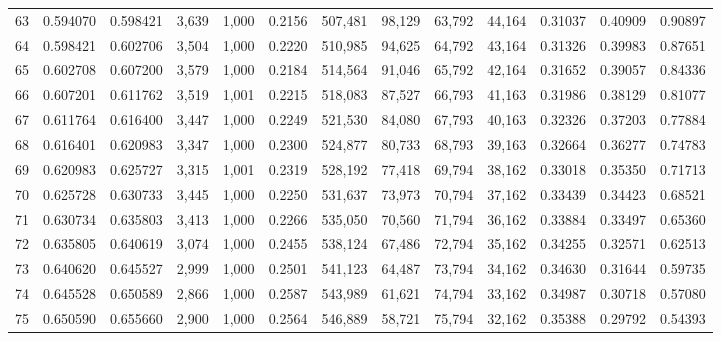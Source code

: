 \begin{tabular}{rrrrrrrrrrrrr}
63  &  0.594070 &  0.598421 &   3,639 &  1,000 &                                     0.2156 &  507,481 &   98,129 &   63,792 &   44,164 &  0.31037 &  0.40909 &  0.90897 \\
64  &  0.598421 &  0.602706 &   3,504 &  1,000 &                                     0.2220 &  510,985 &   94,625 &   64,792 &   43,164 &  0.31326 &  0.39983 &  0.87651 \\
65  &  0.602708 &  0.607200 &   3,579 &  1,000 &                                     0.2184 &  514,564 &   91,046 &   65,792 &   42,164 &  0.31652 &  0.39057 &  0.84336 \\
66  &  0.607201 &  0.611762 &   3,519 &  1,001 &                                     0.2215 &  518,083 &   87,527 &   66,793 &   41,163 &  0.31986 &  0.38129 &  0.81077 \\
67  &  0.611764 &  0.616400 &   3,447 &  1,000 &                                     0.2249 &  521,530 &   84,080 &   67,793 &   40,163 &  0.32326 &  0.37203 &  0.77884 \\
68  &  0.616401 &  0.620983 &   3,347 &  1,000 &                                     0.2300 &  524,877 &   80,733 &   68,793 &   39,163 &  0.32664 &  0.36277 &  0.74783 \\
69  &  0.620983 &  0.625727 &   3,315 &  1,001 &                                     0.2319 &  528,192 &   77,418 &   69,794 &   38,162 &  0.33018 &  0.35350 &  0.71713 \\
70  &  0.625728 &  0.630733 &   3,445 &  1,000 &                                     0.2250 &  531,637 &   73,973 &   70,794 &   37,162 &  0.33439 &  0.34423 &  0.68521 \\
71  &  0.630734 &  0.635803 &   3,413 &  1,000 &                                     0.2266 &  535,050 &   70,560 &   71,794 &   36,162 &  0.33884 &  0.33497 &  0.65360 \\
72  &  0.635805 &  0.640619 &   3,074 &  1,000 &                                     0.2455 &  538,124 &   67,486 &   72,794 &   35,162 &  0.34255 &  0.32571 &  0.62513 \\
73  &  0.640620 &  0.645527 &   2,999 &  1,000 &                                     0.2501 &  541,123 &   64,487 &   73,794 &   34,162 &  0.34630 &  0.31644 &  0.59735 \\
74  &  0.645528 &  0.650589 &   2,866 &  1,000 &                                     0.2587 &  543,989 &   61,621 &   74,794 &   33,162 &  0.34987 &  0.30718 &  0.57080 \\
75  &  0.650590 &  0.655660 &   2,900 &  1,000 &                                     0.2564 &  546,889 &   58,721 &   75,794 &   32,162 &  0.35388 &  0.29792 &  0.54393 \\

\end{tabular}
